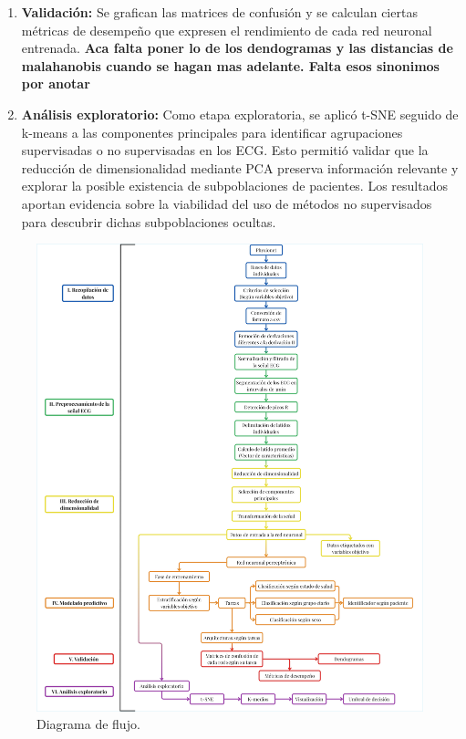 \documentclass[12pt,letterpaper,oneside,openright]{book}
\begin{document}
\begin{enumerate}[label=\textbf{\Roman*.}]
	\item \textbf{Validación:} Se grafican las matrices de confusión y se calculan ciertas métricas de desempeño que expresen el rendimiento de cada red neuronal entrenada. \textbf{Aca falta poner lo de los dendogramas y las distancias de malahanobis cuando se hagan mas adelante. Falta esos sinonimos por anotar}
	\item \textbf{Análisis exploratorio:} Como etapa exploratoria, se aplicó t-SNE seguido de k-means a las componentes principales para identificar agrupaciones supervisadas o no supervisadas en los ECG. Esto permitió validar que la reducción de dimensionalidad mediante PCA preserva información relevante y explorar la posible existencia de subpoblaciones de pacientes. Los resultados aportan evidencia sobre la viabilidad del uso de métodos no supervisados para descubrir dichas subpoblaciones ocultas.
\end{enumerate}


	\begin{figure}[H]
		\centering
		\includegraphics[width=1\linewidth]{Sem_1/figuras/Diagrama_de_flujo_metodologico.jpg}
		\caption{Diagrama de flujo.}
		\label{fig:diagrama_de_flujo_metodologico}
	\end{figure}
\end{document}
